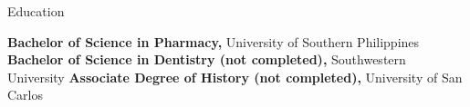 
\begin{rubric}{\faGraduationCap[solid] Education}

\entry*[2013 -- 2015][]%
	\textbf{Bachelor of Science in Pharmacy,} University of Southern Philippines 
%
\entry*[2012 -- 2013][]%
	\textbf{Bachelor of Science in Dentistry (not completed),} Southwestern University
% 
\entry*[2010 -- 2012][]%
	\textbf{Associate Degree of History (not completed),} University of San Carlos
% 
\end{rubric}